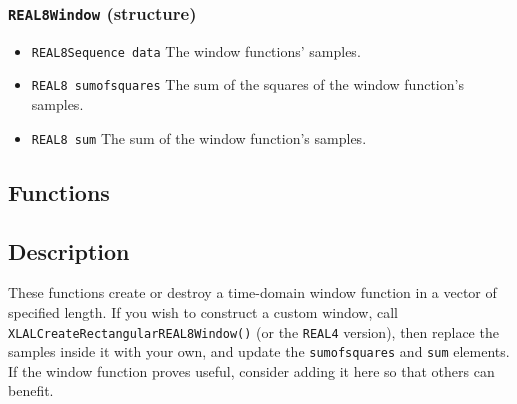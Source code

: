 \subsubsection{\texttt{REAL8Window} (structure)}
\begin{itemize}
\item \texttt{REAL8Sequence data}  The window functions' samples.
\item \texttt{REAL8 sumofsquares}  The sum of the squares of the window
function's samples.
\item \texttt{REAL8 sum}  The sum of the window function's samples.
\end{itemize}


\subsection*{Functions}




\subsection*{Description}

These functions create or destroy a time-domain window function in a vector
of specified length.  If you wish to construct a custom window, call
\texttt{XLALCreateRectangularREAL8Window()} (or the \texttt{REAL4}
version), then replace the samples inside it with your own, and update the
\texttt{sumofsquares} and \texttt{sum} elements.  If the window function
proves useful, consider adding it here so that others can benefit.

